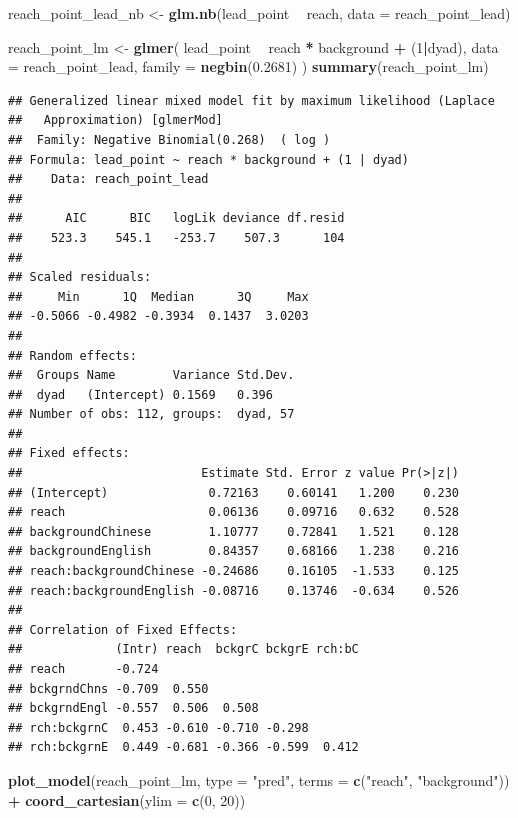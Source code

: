 \documentclass[]{article}
\newenvironment{Shaded}{\begin{snugshade}}{\end{snugshade}}
\newcommand{\DataTypeTok}[1]{\textcolor[rgb]{0.13,0.29,0.53}{#1}}
\newcommand{\DecValTok}[1]{\textcolor[rgb]{0.00,0.00,0.81}{#1}}
\newcommand{\FloatTok}[1]{\textcolor[rgb]{0.00,0.00,0.81}{#1}}
\newcommand{\KeywordTok}[1]{\textcolor[rgb]{0.13,0.29,0.53}{\textbf{#1}}}
\newcommand{\NormalTok}[1]{#1}
\newcommand{\OperatorTok}[1]{\textcolor[rgb]{0.81,0.36,0.00}{\textbf{#1}}}
\newcommand{\StringTok}[1]{\textcolor[rgb]{0.31,0.60,0.02}{#1}}
\begin{document}
\begin{Shaded}
\begin{Highlighting}[]
\NormalTok{reach_point_lead_nb <-}\StringTok{ }\KeywordTok{glm.nb}\NormalTok{(lead_point }\OperatorTok{~}\StringTok{ }\NormalTok{reach, }\DataTypeTok{data =}\NormalTok{ reach_point_lead)}

\NormalTok{reach_point_lm <-}\StringTok{ }\KeywordTok{glmer}\NormalTok{(}
\NormalTok{  lead_point }\OperatorTok{~}
\StringTok{    }\NormalTok{reach }\OperatorTok{*}
\StringTok{    }\NormalTok{background }\OperatorTok{+}
\StringTok{    }\NormalTok{(}\DecValTok{1}\OperatorTok{|}\NormalTok{dyad),}
  \DataTypeTok{data =}\NormalTok{ reach_point_lead,}
  \DataTypeTok{family =} \KeywordTok{negbin}\NormalTok{(}\FloatTok{0.2681}\NormalTok{)}
\NormalTok{)}
\KeywordTok{summary}\NormalTok{(reach_point_lm)}
\end{Highlighting}
\end{Shaded}

\begin{verbatim}
## Generalized linear mixed model fit by maximum likelihood (Laplace
##   Approximation) [glmerMod]
##  Family: Negative Binomial(0.268)  ( log )
## Formula: lead_point ~ reach * background + (1 | dyad)
##    Data: reach_point_lead
## 
##      AIC      BIC   logLik deviance df.resid 
##    523.3    545.1   -253.7    507.3      104 
## 
## Scaled residuals: 
##     Min      1Q  Median      3Q     Max 
## -0.5066 -0.4982 -0.3934  0.1437  3.0203 
## 
## Random effects:
##  Groups Name        Variance Std.Dev.
##  dyad   (Intercept) 0.1569   0.396   
## Number of obs: 112, groups:  dyad, 57
## 
## Fixed effects:
##                         Estimate Std. Error z value Pr(>|z|)
## (Intercept)              0.72163    0.60141   1.200    0.230
## reach                    0.06136    0.09716   0.632    0.528
## backgroundChinese        1.10777    0.72841   1.521    0.128
## backgroundEnglish        0.84357    0.68166   1.238    0.216
## reach:backgroundChinese -0.24686    0.16105  -1.533    0.125
## reach:backgroundEnglish -0.08716    0.13746  -0.634    0.526
## 
## Correlation of Fixed Effects:
##             (Intr) reach  bckgrC bckgrE rch:bC
## reach       -0.724                            
## bckgrndChns -0.709  0.550                     
## bckgrndEngl -0.557  0.506  0.508              
## rch:bckgrnC  0.453 -0.610 -0.710 -0.298       
## rch:bckgrnE  0.449 -0.681 -0.366 -0.599  0.412
\end{verbatim}

\begin{Shaded}
\begin{Highlighting}[]
\KeywordTok{plot_model}\NormalTok{(reach_point_lm, }\DataTypeTok{type =} \StringTok{"pred"}\NormalTok{, }\DataTypeTok{terms =} \KeywordTok{c}\NormalTok{(}\StringTok{"reach"}\NormalTok{, }\StringTok{"background"}\NormalTok{)) }\OperatorTok{+}\StringTok{ }\KeywordTok{coord_cartesian}\NormalTok{(}\DataTypeTok{ylim =} \KeywordTok{c}\NormalTok{(}\DecValTok{0}\NormalTok{, }\DecValTok{20}\NormalTok{))}
\end{Highlighting}
\end{Shaded}
\end{document}
